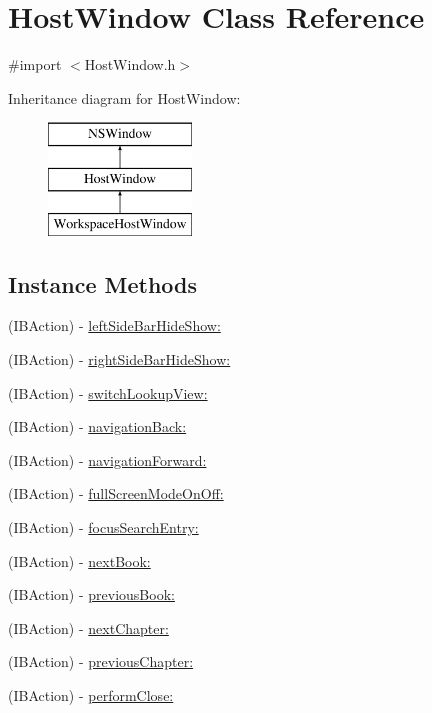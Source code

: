 \hypertarget{interface_host_window}{\section{Host\-Window Class Reference}
\label{interface_host_window}
}


{\ttfamily \#import $<$Host\-Window.\-h$>$}

Inheritance diagram for Host\-Window\-:\begin{figure}[H]
\begin{center}
\leavevmode
\includegraphics[height=3.000000cm]{interface_host_window}
\end{center}
\end{figure}
\subsection*{Instance Methods}
\begin{DoxyCompactItemize}
\item 
(I\-B\-Action) -\/ \hyperlink{interface_host_window_a4f1a59ffe927b9746c01e98799522036}{left\-Side\-Bar\-Hide\-Show\-:}
\item 
(I\-B\-Action) -\/ \hyperlink{interface_host_window_a7a94333e829cba8ea9389f054862d5e8}{right\-Side\-Bar\-Hide\-Show\-:}
\item 
(I\-B\-Action) -\/ \hyperlink{interface_host_window_a694f58c6afa324646611b3c1b336b6de}{switch\-Lookup\-View\-:}
\item 
(I\-B\-Action) -\/ \hyperlink{interface_host_window_a4ec972591bfbe986c29481752489bb7f}{navigation\-Back\-:}
\item 
(I\-B\-Action) -\/ \hyperlink{interface_host_window_a6ad4335b3d6a5e7b82a150b1d6af813c}{navigation\-Forward\-:}
\item 
(I\-B\-Action) -\/ \hyperlink{interface_host_window_a039f89a557a3955a07c700c8a7a1f781}{full\-Screen\-Mode\-On\-Off\-:}
\item 
(I\-B\-Action) -\/ \hyperlink{interface_host_window_ac20a8823c41a8eb84d69a87b9493ab64}{focus\-Search\-Entry\-:}
\item 
(I\-B\-Action) -\/ \hyperlink{interface_host_window_a7b7685c643a48ad37f25d585f1866649}{next\-Book\-:}
\item 
(I\-B\-Action) -\/ \hyperlink{interface_host_window_a581d7b2440e58185f5e41c7cd6af155d}{previous\-Book\-:}
\item 
(I\-B\-Action) -\/ \hyperlink{interface_host_window_a87ff06783b2bc09031f5ccd2a72c3938}{next\-Chapter\-:}
\item 
(I\-B\-Action) -\/ \hyperlink{interface_host_window_ae5eb6b46b077d6f29f42f385df24e0b9}{previous\-Chapter\-:}
\item 
(I\-B\-Action) -\/ \hyperlink{interface_host_window_a7808d4ab43585768c54db08e0b78bae9}{perform\-Close\-:}
\end{DoxyCompactItemize}


